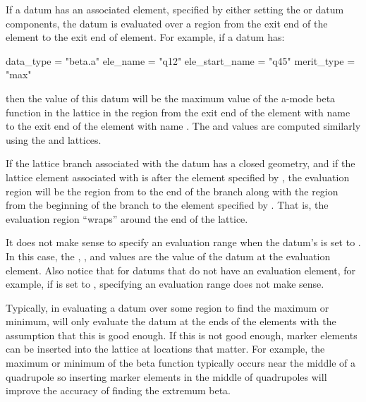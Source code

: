 If a datum has an associated  element, specified by either setting the 
or  datum components, the datum is evaluated over a region from the exit end of the
 element to the exit end of  element. For example, if a datum has:
\begin{example}
  data_type      = "beta.a"
  ele_name       = "q12"
  ele_start_name = "q45"
  merit_type     = "max"
\end{example}
then the  value of this datum will be the maximum value of the a-mode beta function in the
 lattice in the region from the exit end of the element with name  to the exit end
of the element with name . The  and  values are computed similarly using
the  and  lattices. 

If the lattice branch associated with the datum has a closed geometry, and if the lattice element
associated with  is after the element specified by , the evaluation
region will be the region from  to the end of the branch along with the region
from the beginning of the branch to the element specified by . That is, the evaluation
region ``wraps'' around the end of the lattice.  

It does not make sense to specify an evaluation range when the datum's  is set to
. In this case, the , , and  values are the value of the
datum at the evaluation element. Also notice that for datums that do not have an evaluation element,
for example, if  is set to , specifying an evaluation range does not make
sense.

Typically, in evaluating a datum over some region to find the maximum or minimum, \tao will only
evaluate the datum at the ends of the elements with the assumption that this is good enough. If this
is not good enough, marker elements can be inserted into the lattice at locations that matter. For
example, the maximum or minimum of the beta function typically occurs near the middle of a
quadrupole so inserting marker elements in the middle of quadrupoles will improve the accuracy of
finding the extremum beta.

